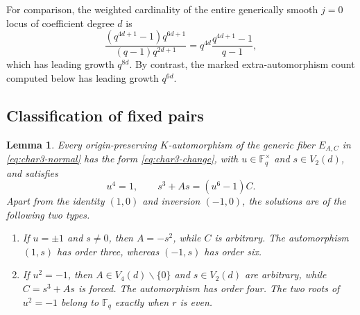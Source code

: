 \documentclass[a4paper,12pt]{amsart}
\newtheorem{lem}[thm]{Lemma}
\theoremstyle{definition}
\newcommand{\Fb}{\mathbb{F}}
\renewcommand{\setminus}{\smallsetminus}
\begin{document}
For comparison, the weighted cardinality of the entire generically smooth $j=0$ locus of coefficient degree $d$ is
\begin{equation}\label{eq:char3-fulljzero}
\frac{(q^{4d+1}-1)q^{6d+1}}
     {(q-1)q^{2d+1}}
=
q^{4d}\frac{q^{4d+1}-1}{q-1},
\end{equation}
which has leading growth $q^{8d}$.  By contrast, the marked extra-automorphism count computed below has leading growth $q^{6d}$.

\subsection{Classification of fixed pairs}

\begin{lem}
\label{lem:char3-autclassification}
Every origin-preserving $K$-automorphism of the generic fiber $E_{A,C}$ in \eqref{eq:char3-normal} has the form \eqref{eq:char3-change}, with $u\in\Fb_q^\times$ and $s\in V_2(d)$, and satisfies
\begin{equation}\label{eq:char3-autcondition}
u^4=1,
\qquad
s^3+As=(u^6-1)C.
\end{equation}
Apart from the identity $(1,0)$ and inversion $(-1,0)$, the solutions are of the following two types.

\begin{enumerate}[\normalfont(i)]
\item If $u=\pm1$ and $s\neq0$, then $A=-s^2$, while $C$ is arbitrary. The automorphism $(1,s)$ has order three, whereas $(-1,s)$ has order six.

\item If $u^2=-1$, then $A\in V_4(d)\setminus\{0\}$ and $s\in V_2(d)$ are arbitrary, while $C=s^3+As$ is forced.  The automorphism has order four.  The two roots of $u^2=-1$ belong to $\Fb_q$ exactly when $r$ is even.
\end{enumerate}
\end{lem}
\end{document}
